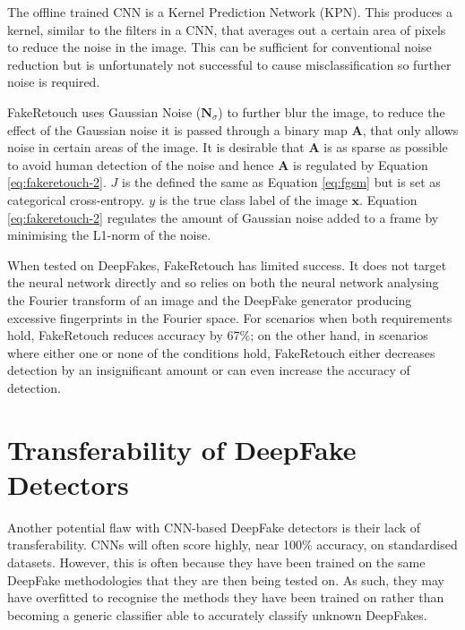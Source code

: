 The offline trained CNN is a Kernel Prediction Network (KPN)\cite{mildenhall2018burst}. This produces a kernel, similar to the filters in a CNN, that averages out a certain area of pixels to reduce the noise in the image. This can be sufficient for conventional noise reduction but is unfortunately not successful to cause misclassification\cite{huang2020fakeretouch} so further noise is required.

FakeRetouch uses Gaussian Noise ($\textbf{N}_{\sigma}$) to further blur the image, to reduce the effect of the Gaussian noise it is passed through a binary map $\textbf{A}$, that only allows noise in certain areas of the image. It is desirable that $\textbf{A}$ is as sparse as possible to avoid human detection of the noise and hence $\textbf{A}$ is regulated by Equation \ref{eq:fakeretouch-2}. $J$ is the defined the same as Equation \ref{eq:fgsm} but is set as categorical cross-entropy. $y$ is the true class label of the image $\textbf{x}$. Equation \ref{eq:fakeretouch-2} regulates the amount of Gaussian noise added to a frame by minimising the L1-norm of the noise.

When tested on DeepFakes, FakeRetouch has limited success. It does not target the neural network directly and so relies on both the neural network analysing the Fourier transform of an image and the DeepFake generator producing excessive fingerprints in the Fourier space. For scenarios when both requirements hold, FakeRetouch reduces accuracy by 67\%; on the other hand, in scenarios where either one or none of the conditions hold, FakeRetouch either decreases detection by an insignificant amount or can even increase the accuracy of detection.

\section{Transferability of DeepFake Detectors}


Another potential flaw with CNN-based DeepFake detectors is their lack of transferability\cite{ricker2022towards}. CNNs will often score highly, near 100\% accuracy, on standardised datasets. However, this is often because they have been trained on the same DeepFake methodologies that they are then being tested on. As such, they may have overfitted to recognise the methods they have been trained on rather than becoming a generic classifier able to accurately classify unknown DeepFakes.

